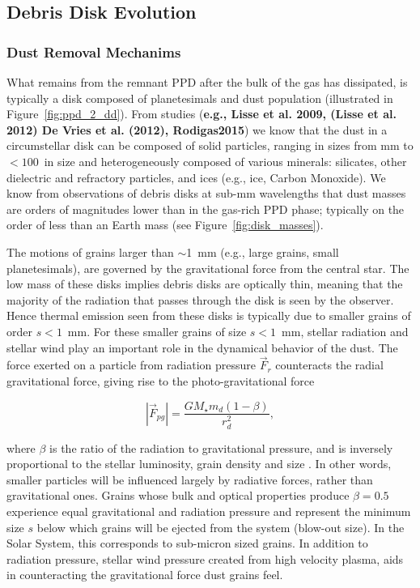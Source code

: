         
    \subsection{Debris Disk Evolution}\label{sec:debrisdisk_phase}
    
    \subsubsection{Dust Removal Mechanims}
    What remains from the remnant PPD after the bulk of the gas has dissipated, is typically a disk composed of planetesimals and dust population (illustrated in Figure~\ref{fig:ppd_2_dd}). From studies (\textbf{e.g., Lisse	et	al.	2009, (Lisse	et	al.	2012) 	De	Vries	et	al.	(2012), Rodigas2015}) we know that the dust in a circumstellar disk can be composed of solid particles, ranging in sizes from mm to $<100$\micron\ in size and heterogeneously composed of various minerals: silicates, other dielectric and refractory particles, and ices (e.g., ice, Carbon Monoxide). We know from observations of debris disks at sub-mm wavelengths that dust masses are orders of magnitudes lower than in the gas-rich PPD phase; typically on the order of less than an Earth mass (see Figure~\ref{fig:disk_masses}). 

    The motions of grains larger than $\sim$1~mm (e.g., large grains, small planetesimals), are governed by the gravitational force from the central star. The low mass of these disks implies  debris disks are optically thin, meaning that the majority of the radiation that passes through the disk is seen by the observer. Hence thermal emission seen from these disks is typically due to smaller grains of order $s<1$~mm. For these smaller grains of size $s<1$~mm, stellar radiation and stellar wind play an important role in the dynamical behavior of the dust. The force exerted on a particle from radiation pressure $\vec{F}_r$ counteracts the radial gravitational force, giving rise to the photo-gravitational force
    
    \begin{equation}\label{eq:photograv_force}
    \left|\vec{F}_{pg}\right|= \frac{GM_\star m_d(1-\beta)}{r_d^2},
    \end{equation}
    
    \noindent where $\beta$ is the ratio of the radiation to gravitational pressure, and is inversely proportional to the stellar luminosity, grain density and size \citep{Burns1979}. In other words, smaller particles will be influenced largely by radiative forces, rather than gravitational ones. Grains whose bulk and optical properties produce $\beta=0.5$ experience equal gravitational and radiation pressure and represent the minimum size $s$ below which grains will be ejected from the system (blow-out size). In the Solar System, this corresponds to sub-micron sized grains. In addition to radiation pressure, stellar wind pressure created from high velocity plasma, aids in counteracting the gravitational force dust grains feel. 

